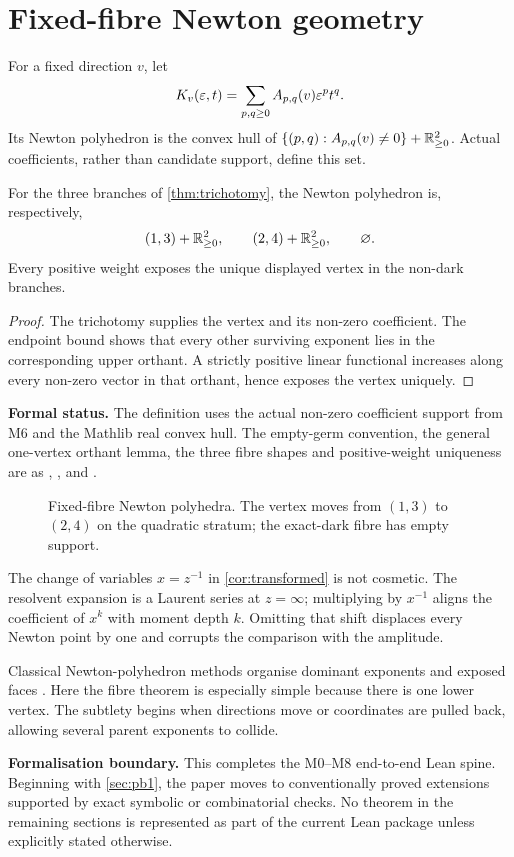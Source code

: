 \section{Fixed-fibre Newton geometry}\label{sec:fixednewton}

For a fixed direction \(v\), let
\[
K_v(\varepsilon,t)=\sum_{p,q\ge0}A_{p,q}(v)\varepsilon^pt^q.
\]
Its Newton polyhedron is the convex hull of
\(\{(p,q):A_{p,q}(v)\ne0\}+\mathbb R_{\ge0}^2\).  Actual coefficients, rather than
candidate support, define this set.

\begin{theorem}\label{thm:fibrenewton}
For the three branches of \cref{thm:trichotomy}, the Newton polyhedron is,
respectively,
\[
(1,3)+\mathbb R_{\ge0}^2,\qquad
(2,4)+\mathbb R_{\ge0}^2,\qquad
\varnothing.
\]
Every positive weight exposes the unique displayed vertex in the non-dark
branches.
\end{theorem}
\begin{proof}
The trichotomy supplies the vertex and its non-zero coefficient.  The endpoint
bound shows that every other surviving exponent lies in the corresponding
upper orthant.  A strictly positive linear functional increases along every
non-zero vector in that orthant, hence exposes the vertex uniquely.
\end{proof}

\noindent\textbf{Formal status.}
The definition uses the actual non-zero coefficient support from M6 and the
Mathlib real convex hull.  The empty-germ convention, the general one-vertex
orthant lemma, the three fibre shapes and positive-weight uniqueness are
 as ,
,
 and
.

\begin{figure}[ht]
\centering
\caption{Fixed-fibre Newton polyhedra.  The vertex moves from \((1,3)\) to
\((2,4)\) on the quadratic stratum; the exact-dark fibre has empty support.}
\label{fig:fixednewton}
\end{figure}

The change of variables \(x=z^{-1}\) in \cref{cor:transformed} is not cosmetic.
The resolvent expansion is a Laurent series at \(z=\infty\); multiplying by
\(x^{-1}\) aligns the coefficient of \(x^k\) with moment depth \(k\).  Omitting
that shift displaces every Newton point by one and corrupts the comparison with
the amplitude.

Classical Newton-polyhedron methods organise dominant exponents and exposed
faces \parencite{Kouchnirenko1976,Varchenko1976}.  Here the fibre theorem is
especially simple because there is one lower vertex.  The subtlety begins when
directions move or coordinates are pulled back, allowing several parent
exponents to collide.

\medskip
\noindent\textbf{Formalisation boundary.}
This completes the M0--M8 end-to-end Lean spine.  Beginning with
\cref{sec:pb1}, the paper moves to conventionally proved extensions supported
by exact symbolic or combinatorial checks.  No theorem in the remaining
sections is represented as part of the current Lean package unless explicitly
stated otherwise.
